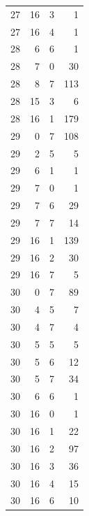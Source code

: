\begin{longtable}{rrrr}
27 & 16 & 3 & 1\\
27 & 16 & 4 & 1\\
28 & 6 & 6 & 1\\
28 & 7 & 0 & 30\\
28 & 8 & 7 & 113\\
28 & 15 & 3 & 6\\
28 & 16 & 1 & 179\\
29 & 0 & 7 & 108\\
29 & 2 & 5 & 5\\
29 & 6 & 1 & 1\\
29 & 7 & 0 & 1\\
29 & 7 & 6 & 29\\
29 & 7 & 7 & 14\\
29 & 16 & 1 & 139\\
29 & 16 & 2 & 30\\
29 & 16 & 7 & 5\\
30 & 0 & 7 & 89\\
30 & 4 & 5 & 7\\
30 & 4 & 7 & 4\\
30 & 5 & 5 & 5\\
30 & 5 & 6 & 12\\
30 & 5 & 7 & 34\\
30 & 6 & 6 & 1\\
30 & 16 & 0 & 1\\
30 & 16 & 1 & 22\\
30 & 16 & 2 & 97\\
30 & 16 & 3 & 36\\
30 & 16 & 4 & 15\\
30 & 16 & 6 & 10\\
\bottomrule
\end{longtable}